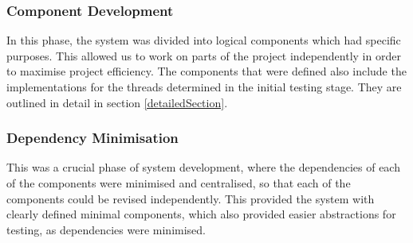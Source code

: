 \subsubsection{Component Development}
In this phase, the system was divided into logical components which had specific purposes. This allowed us to work on parts of the project independently in order to maximise project efficiency. The components that were defined also include the implementations for the threads determined in the initial testing stage. They are outlined in detail in section \ref{detailedSection}.

\subsubsection{Dependency Minimisation}
This was a crucial phase of system development, where the dependencies of each of the components were minimised and centralised, so that each of the components could be revised independently. This provided the system with clearly defined minimal components, which also provided easier abstractions for testing, as dependencies were minimised.

